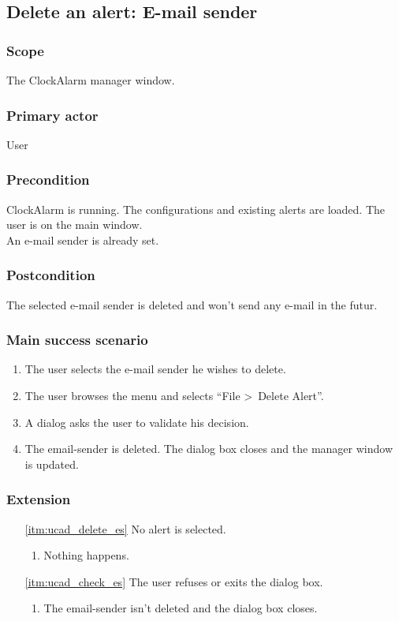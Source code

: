 \subsection{Delete an alert: E-mail sender}\label{subsec:usecase_delete_email_sender}

\subsubsection{Scope}
The ClockAlarm manager window.
\subsubsection{Primary actor}
User
\subsubsection{Precondition}
ClockAlarm is running. The configurations and existing alerts are loaded. The user is on the main window.
\\An e-mail sender is already set.
\subsubsection{Postcondition}
The selected e-mail sender is deleted and won't send any e-mail in the futur.
\subsubsection{Main success scenario}
\begin{enumerate}
	\item The user selects the e-mail sender he wishes to delete.
	\item \label{itm:ucad_delete_es} The user browses the menu and selects ``File \textgreater~Delete Alert''.
	\item \label{itm:ucad_check_es} A dialog asks the user to validate his decision.
	\item The email-sender is deleted. The dialog box closes and the manager window is updated.
\end{enumerate}
\subsubsection{Extension}
\begin{enumerate}
	\item[\ref{itm:ucad_delete_es}] No alert is selected.
	\begin{enumerate}[i]
		\item Nothing happens.
	\end{enumerate}
	
	\item[\ref{itm:ucad_check_es}] The user refuses or exits the dialog box.
	\begin{enumerate}[i]
		\item The email-sender isn't deleted and the dialog box closes.
	\end{enumerate}
\end{enumerate}